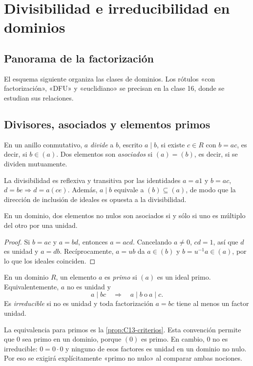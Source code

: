 \section{Divisibilidad e irreducibilidad en dominios}
\subsection{Panorama de la factorización}
El esquema siguiente organiza las clases de dominios. Los rótulos «con factorización», «DFU» y «euclidiano» se precisan en la clase 16, donde se estudian sus relaciones.


\subsection{Divisores, asociados y elementos primos}
\begin{defi}
En un anillo conmutativo, $a$ \emph{divide} a $b$, escrito $a\mid b$, si existe $c\in R$ con $b=ac$, es decir, si $b\in(a)$. Dos elementos son \emph{asociados} si $(a)=(b)$, es decir, si se dividen mutuamente.
\end{defi}
La divisibilidad es reflexiva y transitiva por las identidades $a=a1$ y $b=ac$, $d=be\Rightarrow d=a(ce)$. Además, $a\mid b$ equivale a $(b)\subseteq(a)$, de modo que la dirección de inclusión de ideales es opuesta a la divisibilidad.

\begin{lema}\label{lema:C15-asociados}
En un dominio, dos elementos no nulos son asociados si y sólo si uno es múltiplo del otro por una unidad.
\end{lema}
\begin{proof}
Si $b=ac$ y $a=bd$, entonces $a=acd$. Cancelando $a\ne0$, $cd=1$, así que $d$ es unidad y $a=db$. Recíprocamente, $a=ub$ da $a\in(b)$ y $b=u^{-1}a\in(a)$, por lo que los ideales coinciden.
\end{proof}

\begin{defi}
En un dominio $R$, un elemento $a$ es \emph{primo} si $(a)$ es un ideal primo. Equivalentemente, $a$ no es unidad y
\[
a\mid bc\quad\Longrightarrow\quad a\mid b\ \text{o}\ a\mid c.
\]
Es \emph{irreducible} si no es unidad y toda factorización $a=bc$ tiene al menos un factor unidad.
\end{defi}
La equivalencia para primos es la \cref{prop:C13-criterios}. Esta convención permite que $0$ sea primo en un dominio, porque $(0)$ es primo. En cambio, $0$ no es irreducible: $0=0\cdot0$ y ninguno de esos factores es unidad en un dominio no nulo. Por eso se exigirá explícitamente «primo no nulo» al comparar ambas nociones.

